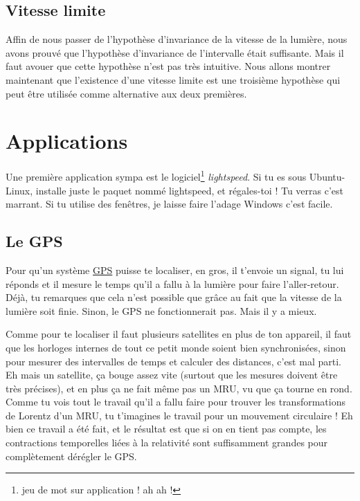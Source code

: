 					\subsection{Vitesse limite}

Affin de nous passer de l'hypothèse d'invariance de la vitesse de la lumière, nous avons prouvé que l'hypothèse d'invariance de l'intervalle était suffisante. Mais il faut avouer que cette hypothèse n'est pas très intuitive. Nous allons montrer maintenant que l'existence d'une vitesse limite est une troisième hypothèse qui peut être utilisée comme alternative aux deux premières.

\section{Applications}

Une première application sympa est le logiciel\footnote{jeu de mot sur \og application\fg{}  ! ah ah !} \emph{lightspeed}. Si tu es sous Ubuntu-Linux, installe juste le paquet nommé lightspeed, et régales-toi ! Tu verras c'est marrant. Si tu utilise des fenêtres, je laisse faire l'adage \og Windows c'est facile\fg.

\subsection{Le GPS}

Pour qu'un système \href{http://fr.wikipedia.org/wiki/Global\_Positioning\_System}{GPS} puisse te localiser, en gros, il t'envoie un signal, tu lui réponds et il mesure le temps qu'il a fallu à la lumière pour faire l'aller-retour. Déjà, tu remarques que cela n'est possible que grâce au fait que la vitesse de la lumière soit finie. Sinon, le GPS ne fonctionnerait pas. Mais il y a mieux.

Comme pour te localiser il faut plusieurs satellites en plus de ton appareil, il faut que les horloges internes de tout ce petit monde soient bien synchronisées, sinon pour mesurer des intervalles de temps et calculer des distances, c'est mal parti. Eh mais un satellite, ça bouge assez vite (surtout que les mesures doivent être très précises), et en plus ça ne fait même pas un MRU, vu que ça tourne en rond. Comme tu vois tout le travail qu'il a fallu faire pour trouver les transformations de Lorentz d'un MRU, tu t'imagines le travail pour un mouvement circulaire ! Eh bien ce travail a été fait, et le résultat est que si on en tient pas compte, les contractions temporelles liées à la relativité sont suffisamment grandes pour complètement dérégler le GPS.


